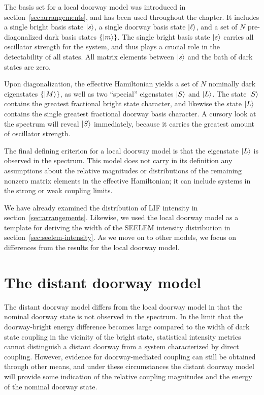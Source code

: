 \documentclass[12pt]{mitthesis}
\begin{document}
The basis set for a local doorway model was introduced in
section~\ref{sec:arrangements}, and has been used throughout the
chapter. It includes a single bright basis state $\mathinner{|{s}\rangle}$, a single
doorway basis state $\mathinner{|{\ell}\rangle}$, and a set of $N$ pre-diagonalized
dark basis states $\lbrace \mathinner{|{m}\rangle} \rbrace$.  The single bright basis
state $\mathinner{|{s}\rangle}$ carries all oscillator strength for the system, and
thus plays a crucial role in the detectability of all states.  All
matrix elements between $\mathinner{|{s}\rangle}$ and the bath of dark states are
zero.

Upon diagonalization, the effective Hamiltonian yields a set of $N$
nominally dark eigenstates $\lbrace \mathinner{|{M}\rangle} \rbrace$, as well as two
``special'' eigenstates $\mathinner{|{S}\rangle}$ and $\mathinner{|{L}\rangle}$.  The state $\mathinner{|{S}\rangle}$
contains the greatest fractional bright state character, and likewise
the state $\mathinner{|{L}\rangle}$ contains the single greatest fractional doorway
basis character.  A cursory look at the spectrum will reveal $\mathinner{|{S}\rangle}$
immediately, because it carries the greatest amount of oscillator
strength.

The final defining criterion for a local doorway model is that the
eigenstate $\mathinner{|{L}\rangle}$ is observed in the spectrum.  This model does not
carry in its definition any assumptions about the relative magnitudes
or distributions of the remaining nonzero matrix elements in the
effective Hamiltonian; it can include systems in the strong or weak
coupling limits.

We have already examined the distribution of LIF intensity in
section~\ref{sec:arrangements}.  Likewise, we used the local doorway
model as a template for deriving the width of the SEELEM intensity
distribution in section~\ref{sec:seelem-intensity}.  As we move on to
other models, we focus on differences from the results for the local
doorway model.

%

\section{The distant doorway model}
\label{sec:model-distant}

The distant doorway model differs from the local doorway model in that
the nominal doorway state is not observed in the spectrum.  In the
limit that the doorway-bright energy difference becomes large compared
to the width of dark state coupling in the vicinity of the bright
state, statistical intensity metrics cannot distinguish a distant
doorway from a system characterized by direct coupling.  However,
evidence for doorway-mediated coupling can still be obtained through
other means, and under these circumstances the distant doorway model
will provide some indication of the relative coupling magnitudes and
the energy of the nominal doorway state.
\end{document}

